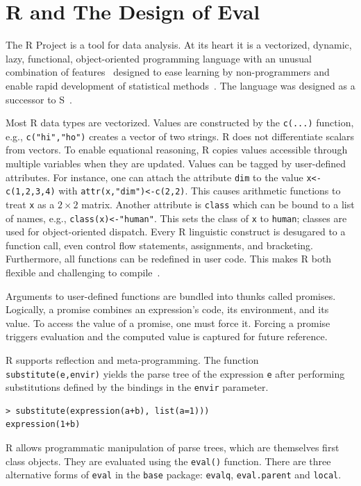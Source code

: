 \documentclass[USenglish,cleveref, autoref, thm-restate]{lipics-v2019}
\newcommand{\eval}{\texttt{eval}\xspace}
\renewcommand{\c}[1]{\lstinline{#1}\xspace}
\begin{document}
\section{R and The Design of Eval}

The R Project is a tool for data analysis.  At its heart it is a {vectorized,
  dynamic, lazy, functional, object-oriented} programming language with an
unusual combination of features~\cite{ecoop12} designed to ease learning by
non-programmers and enable rapid development of statistical
methods~\cite{R96}.  The language was designed as a successor to
S~\cite{S88}.



Most R data types are vectorized. Values are constructed by the \c{c(...)}
function, e.g., \c{c("hi","ho")} creates a vector of two strings.  R does
not differentiate scalars from vectors. To enable equational reasoning, R
copies values accessible through multiple variables when they are updated.
Values can be tagged by user-defined attributes. For instance, one can
attach the attribute \c{dim} to the value \c{x<-c(1,2,3,4)} with
\c{attr(x,"dim")<-c(2,2)}.  This causes arithmetic functions to treat \c x
as a $2 \times 2$ matrix. Another attribute is \c{class} which can be bound to a list
of names, e.g., \c{class(x)<-"human"}. This sets the class of \c{x} to
\c{human}; classes are used for object-oriented dispatch.  Every R
linguistic construct is desugared to a function call, even control flow
statements, assignments, and bracketing. Furthermore, all functions can be
redefined in user code. This makes R both flexible and challenging to
compile~\cite{dls19}.

Arguments to user-defined functions are bundled into thunks called
promises. Logically, a promise combines an expression's code, its
environment, and its value.  To access the value of a promise, one must
force it. Forcing a promise triggers evaluation and the computed value is
captured for future reference.


R supports reflection and meta-programming. The function \c{substitute(e,envir)}
yields the parse tree of the expression \c{e} after performing substitutions
defined by the bindings in the \c{envir} parameter.

\begin{lstlisting}
> substitute(expression(a+b), list(a=1)))  
expression(1+b)
\end{lstlisting}

\noindent
R allows programmatic manipulation of parse trees, which are themselves
first class objects. They are evaluated using the \c{eval()}
function. There are three alternative forms  of \eval in the \c{base} package:
\c{evalq}, \c{eval.parent} and \c{local}.
\end{document}
